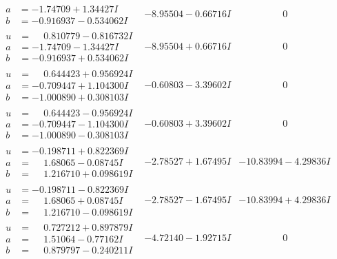 \documentclass[1p]{elsarticle_modified}
\theoremstyle{definition}
\begin{document}
$$\begin{array}{c|c|c}
\begin{aligned}
a &= -1.74709 + 1.34427 I \\
b &= -0.916937 - 0.534062 I\end{aligned}
 & -8.95504 - 0.66716 I & \phantom{-0.000000 } 0 \\ \hline\begin{aligned}
u &= \phantom{-}0.810779 - 0.816732 I \\
a &= -1.74709 - 1.34427 I \\
b &= -0.916937 + 0.534062 I\end{aligned}
 & -8.95504 + 0.66716 I & \phantom{-0.000000 } 0 \\ \hline\begin{aligned}
u &= \phantom{-}0.644423 + 0.956924 I \\
a &= -0.709447 + 1.104300 I \\
b &= -1.000890 + 0.308103 I\end{aligned}
 & -0.60803 - 3.39602 I & \phantom{-0.000000 } 0 \\ \hline\begin{aligned}
u &= \phantom{-}0.644423 - 0.956924 I \\
a &= -0.709447 - 1.104300 I \\
b &= -1.000890 - 0.308103 I\end{aligned}
 & -0.60803 + 3.39602 I & \phantom{-0.000000 } 0 \\ \hline\begin{aligned}
u &= -0.198711 + 0.822369 I \\
a &= \phantom{-}1.68065 - 0.08745 I \\
b &= \phantom{-}1.216710 + 0.098619 I\end{aligned}
 & -2.78527 + 1.67495 I & -10.83994 - 4.29836 I \\ \hline\begin{aligned}
u &= -0.198711 - 0.822369 I \\
a &= \phantom{-}1.68065 + 0.08745 I \\
b &= \phantom{-}1.216710 - 0.098619 I\end{aligned}
 & -2.78527 - 1.67495 I & -10.83994 + 4.29836 I \\ \hline\begin{aligned}
u &= \phantom{-}0.727212 + 0.897879 I \\
a &= \phantom{-}1.51064 - 0.77162 I \\
b &= \phantom{-}0.879797 - 0.240211 I\end{aligned}
 & -4.72140 - 1.92715 I & \phantom{-0.000000 } 0 \\ \hline\begin{aligned}

\end{aligned}
\end{array}$$
\end{document}
